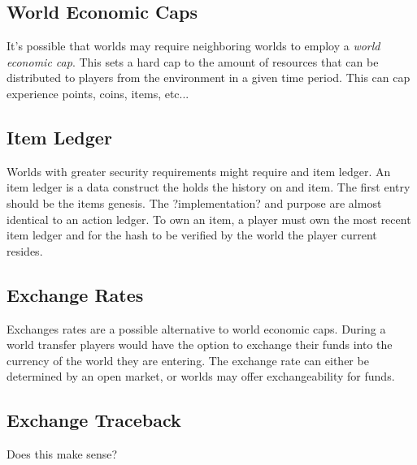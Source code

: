 \documentclass[runningheads,a4paper]{llncs}
\begin{document}
\subsection{World Economic Caps}
It's possible that worlds may require neighboring worlds to employ a \textit{world economic cap}. This sets a hard cap to the amount of resources that can be distributed to players from the environment in a given time period. This can cap experience points, coins, items, etc...

\subsection{Item Ledger}
\label{IL}
Worlds with greater security requirements might require and item ledger. An item ledger is a data construct the holds the history on and item. The first entry should be the items genesis. The ?implementation? and purpose are almost identical to an action ledger. To own an item, a player must own the most recent item ledger and for the hash to be verified by the world the player current resides.


\subsection{Exchange Rates}
\label{ER}
Exchanges rates are a possible alternative to world economic caps. During a world transfer players would have the option to exchange their funds into the currency of the world they are entering. The exchange rate can either be determined by an open market, or worlds may offer exchangeability for funds.


\subsection{Exchange Traceback}
Does this make sense?
\end{document}
